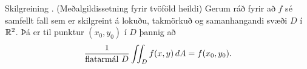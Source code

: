 \begin{frame}{} 

\begin {block}{Skilgreining \kaflanr.}
(Meðalgildissetning fyrir tvöföld heildi)
Gerum ráð fyrir að $f$ sé samfellt fall sem er skilgreint á lokuðu, takmörkuð og samanhangandi svæði $D$ í ${\mathbb R}^2$.   Þá er til punktur $(x_0,y_0)$ í $D$ þannig að 
$$\frac{1}{\mbox{flatarmál }D}\int\!\!\!\int_D f(x,y)\,dA=f(x_0,y_0).$$
\end{block}

\end{frame}

